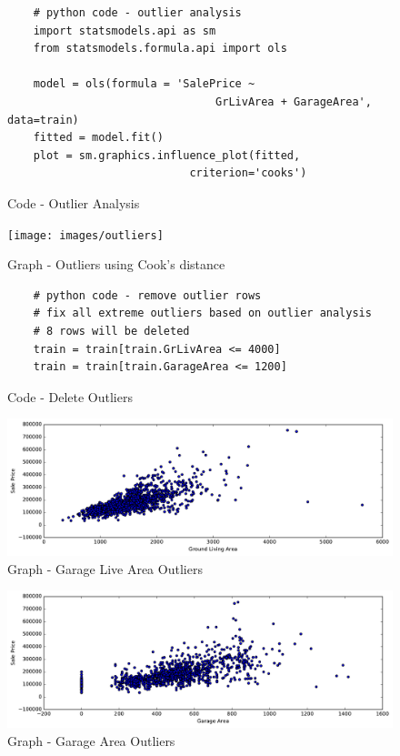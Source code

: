 \documentclass[sigconf]{acmart}
\begin{document}
	\begin{figure}[htb]		
	\begin{verbatim}	
	# python code - outlier analysis
	import statsmodels.api as sm
	from statsmodels.formula.api import ols
	
	model = ols(formula = 'SalePrice ~ 
								GrLivArea + GarageArea', data=train)
	fitted = model.fit()    	
	plot = sm.graphics.influence_plot(fitted, 
							criterion='cooks')		
	\end{verbatim}
	\caption{Code - Outlier Analysis} \label{c:code-outliers} 
	\end{figure}

	\begin{figure}[htb]
		\centering
		\texttt{[image: images/outliers]}	
		\caption{Graph - Outliers using Cook's distance} \label{fig:fig-outliers} 
	\end{figure}
	
	\begin{figure}[htb]				
	\begin{verbatim}	
	# python code - remove outlier rows
	# fix all extreme outliers based on outlier analysis
	# 8 rows will be deleted
	train = train[train.GrLivArea <= 4000]
	train = train[train.GarageArea <= 1200]
	\end{verbatim}
	\caption{Code - Delete Outliers} \label{c:code-del-outliers} 
	\end{figure}

	\begin{figure}[htb]
	\centering
	\includegraphics[width=.95\columnwidth]{images/gr_liv_area_outlier}	
	\caption{Graph - Garage Live Area Outliers} \label{fig:gr-liv-area-outlier} 
	\end{figure}

	\begin{figure}[htb]
	\centering
	\includegraphics[width=.95\columnwidth]{images/garage_area_outlier}	
	\caption{Graph - Garage Area Outliers} \label{fig:garage-area-outlier} 
	\end{figure}
\end{document}

